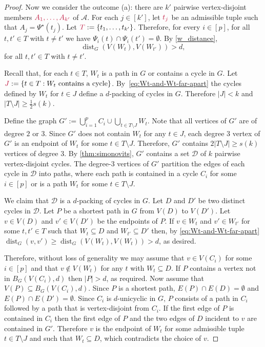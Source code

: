 \documentclass{patmorin}
\DeclareMathOperator{\dist}{dist}
\DeclarePairedDelimiter\set{\{}{\}}
\begin{document}
\begin{proof}
Now we consider the outcome (a): 
there are $k'$ pairwise vertex-disjoint members $\mathdefin{A_1,\ldots,A_{k'}}$ of $\mathcal{A}$. 
For each $j\in[k']$, let $\mathdefin{t_j}$ be an admissible tuple such that $A_j = \Psi^\star(t_j)$. 
Let $\mathdefin{T}:=\set{t_1,\ldots, t_{k'}}$. 
Therefore, for every $i\in[p]$, for all $t,t'\in T$ with $t\neq t'$ we have $\Psi_i(t) \cap \Psi_i(t') = \emptyset$. 
By \cref{w_distance}, 
\begin{equation}\label{eq:Wt-and-Wt-far-apart}
\dist_G(V(W_{t}), V(W_{t'}))> d, 
\end{equation}
for all $t,t'\in T$ with $t\neq t'$. 

Recall that, for each $t\in T$, $W_t$ is a path in $G$ or contains a cycle in $G$. 
Let $\mathdefin{J}:=\{t\in T:\text{$W_t$ contains a cycle}\}$.  By~\eqref{eq:Wt-and-Wt-far-apart} the cycles defined by $W_t$ for $t\in J$ define a $d$-packing of cycles in $G$.  Therefore $|J|<k$ and $|T\setminus J|\geq \tfrac{1}{2}s(k)$.

Define the graph $G':=\bigcup_{i=1}^p C_i\cup \bigcup_{t\in T\setminus J} W_{t}$.  
Note that all vertices of $G'$ are of degree $2$ or $3$.  Since $G'$ does not contain $W_t$ for any $t\in J$, each degree $3$ vertex of $G'$ is an endpoint of $W_{t}$ for some $t\in T\setminus J$. 
Therefore, $G'$ contains $2|T\setminus J|\geq s(k)$ vertices of degree $3$.
By \cref{thm:simonovits}, $G'$ contains a set $\mathcal{D}$ of $k$ pairwise vertex-disjoint cycles.  The degree-$3$ vertices of $G'$ partition the edges of each cycle in $\mathcal{D}$ into paths, where each path is contained in a cycle $C_i$ for some $i\in[p]$ or is a path $W_t$ for some $t\in T\setminus J$.  

We claim that $\mathcal{D}$ is a $d$-packing of cycles in $G$. 
Let $D$ and $D'$ be two distinct cycles in $\mathcal{D}$.  Let $P$ be a shortest path in $G$ from $V(D)$ to $V(D')$.  Let $v\in V(D)$ and $v'\in V(D')$ be the endpoints of $P$.  If $v\in W_t$ and $v'\in W_{t'}$ for some $t,t'\in T$ such that $W_t\subseteq D$ and $W_{t'}\subseteq D'$ then, by \cref{eq:Wt-and-Wt-far-apart} $\dist_G(v,v')\ge \dist_G(V(W_t),V(W_t))>d$, as desired.  

Therefore, without loss of generality we may assume that $v\in V(C_i)$ for some $i\in[p]$ and that $v\notin V(W_t)$ for any $t$ with $W_t\subseteq D$.  If $P$ contains a vertex not in $B_G(V(C_i),d)$ then $|P|>d$, as required.  Now assume that $V(P)\subseteq B_G(V(C_i),d)$. Since $P$ is a shortest path, $E(P)\cap E(D)=\emptyset$ and $E(P)\cap E(D')=\emptyset$.  Since $C_i$ is $d$-unicyclic in $G$, $P$ consists of a path in $C_i$ followed by a path that is vertex-disjoint from $C_i$. If the first edge of $P$ is contained in $C_i$ then the first edge of $P$ and the two edges of $D$ incident to $v$ are contained in $G'$.  Therefore $v$ is the endpoint of $W_t$ for some admissible tuple $t\in T\setminus J$ and such that $W_t\subseteq D$, which contradicts the choice of $v$.



\end{proof}
\end{document}
